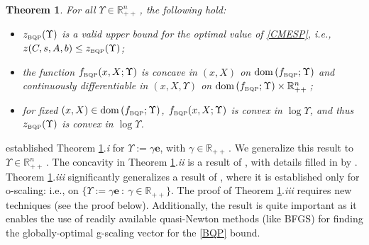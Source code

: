 \documentclass[smallextended]{svjour3hack}       %
\newtheorem{thm}{Theorem}{\bf}{\rm}
\DeclareMathOperator{\dom}{dom}
\begin{document}
\begin{thm}\label{thm:bqp}
For all $\Upsilon \in \mathbb{R}_{++}^n$\,, %
the following hold:
\begin{itemize}
\item[\ref{thm:bqp}.i.] \label{bqp.i}  $z_{{\tiny\mbox{BQP}}}(\Upsilon)$ is a valid upper bound for the optimal value of \ref{CMESP}, i.e., $z(C,s,A,b)\leq z_{{\tiny\mbox{BQP}}}(\Upsilon)$;
\item[\ref{thm:bqp}.ii.] \label{bqp.ii} the function $f_{{\tiny\mbox{BQP}}}(x,X;\Upsilon)$ is concave in $(x,X)$ on $\dom\left(f_{{\tiny\mbox{BQP}}};\Upsilon\right)$ and continuously differentiable in $(x,X, \Upsilon)$ on
$\dom\left(f_{{\tiny\mbox{BQP}}};\Upsilon\right) \times \mathbb{R}_{++}^n$\,;
\item[\ref{thm:bqp}.iii.] \label{bqp.iii} for fixed $(x,X)\in \dom\left(f_{{\tiny\mbox{BQP}}};\Upsilon\right)$, $f_{{\tiny\mbox{BQP}}}(x,X;\Upsilon)$ is convex in $\log \Upsilon$, and thus $z_{{\tiny\mbox{BQP}}}(\Upsilon)$ is convex in $\log \Upsilon$.
\end{itemize}
\end{thm}

\begin{remark}
\noindent \cite{Anstreicher_BQP_entropy} established Theorem \ref{thm:bqp}.\emph{i} for $\Upsilon:=\gamma\mathbf{e}$, with $\gamma\in \mathbb{R}_{++}$\,. We generalize this result to $\Upsilon\in \mathbb{R}^n_{++}$\,. The concavity in Theorem \ref{thm:bqp}.\emph{ii}
is a result of \cite{Anstreicher_BQP_entropy}, with details
filled in by \cite[Section 3.6.1]{FLbook}. Theorem \ref{thm:bqp}.\emph{iii}
significantly generalizes a result of \cite{chen_mixing}, where it is
established only for o-scaling: i.e., on $\{ \Upsilon:= \gamma \mathbf{e} ~:~ \gamma\in \mathbb{R}_{++}\}$. The proof of Theorem \ref{thm:bqp}.\emph{iii} requires new techniques (see the proof below). Additionally, the result is quite important as it enables the use of readily available quasi-Newton methods (like BFGS) for finding the globally-optimal g-scaling vector for the \ref{BQP} bound.
\end{remark}
\end{document}
